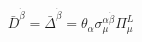 \begin{equation} 
\bar{D}^{\dot{\beta}} = \bar{\Delta}^{\dot{\beta}} = \theta_{\alpha} 
\sigma_{\mu}^{\alpha \dot{\beta}} \Pi_{\mu}^{L}  
\end{equation} 
